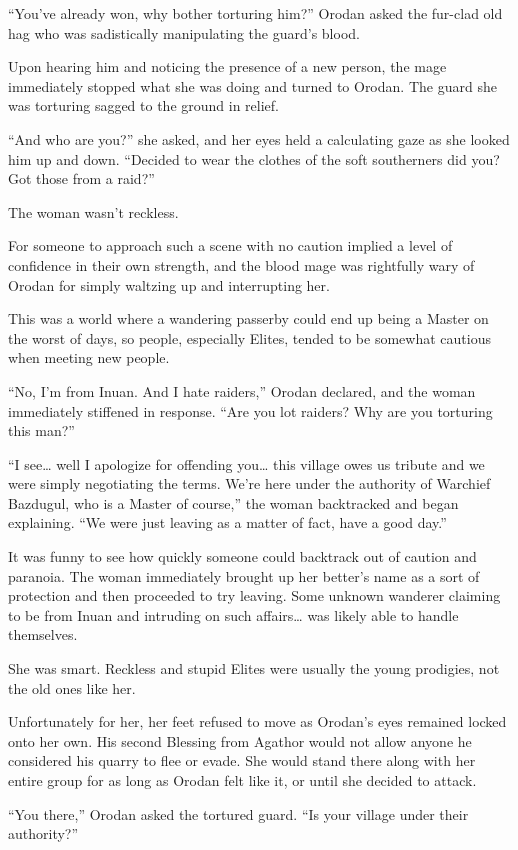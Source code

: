 \documentclass[a4paper,10pt]{book}
\begin{document}
“You’ve already won, why bother torturing him?” Orodan asked the fur-clad old hag who was sadistically manipulating the guard’s blood.\par
Upon hearing him and noticing the presence of a new person, the mage immediately stopped what she was doing and turned to Orodan. The guard she was torturing sagged to the ground in relief.\par
“And who are you?” she asked, and her eyes held a calculating gaze as she looked him up and down. “Decided to wear the clothes of the soft southerners did you? Got those from a raid?”\par
The woman wasn’t reckless.\par
For someone to approach such a scene with no caution implied a level of confidence in their own strength, and the blood mage was rightfully wary of Orodan for simply waltzing up and interrupting her.\par
This was a world where a wandering passerby could end up being a Master on the worst of days, so people, especially Elites, tended to be somewhat cautious when meeting new people.\par
“No, I’m from Inuan. And I hate raiders,” Orodan declared, and the woman immediately stiffened in response. “Are you lot raiders? Why are you torturing this man?”\par
“I see… well I apologize for offending you… this village owes us tribute and we were simply negotiating the terms. We’re here under the authority of Warchief Bazdugul, who is a Master of course,” the woman backtracked and began explaining. “We were just leaving as a matter of fact, have a good day.”\par
It was funny to see how quickly someone could backtrack out of caution and paranoia. The woman immediately brought up her better’s name as a sort of protection and then proceeded to try leaving. Some unknown wanderer claiming to be from Inuan and intruding on such affairs… was likely able to handle themselves.\par
She was smart. Reckless and stupid Elites were usually the young prodigies, not the old ones like her.\par
Unfortunately for her, her feet refused to move as Orodan’s eyes remained locked onto her own. His second Blessing from Agathor would not allow anyone he considered his quarry to flee or evade. She would stand there along with her entire group for as long as Orodan felt like it, or until she decided to attack.\par
“You there,” Orodan asked the tortured guard. “Is your village under their authority?”\par
\end{document}
